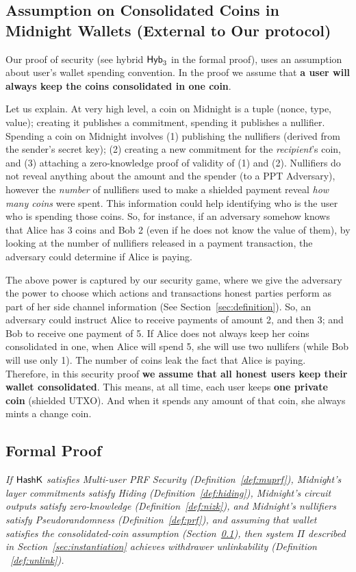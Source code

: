 \subsection{ Assumption on Consolidated Coins in Midnight Wallets (External to Our protocol)}
\label{sub:nofingerprint}
Our proof of security  (see hybrid $\mathsf{Hyb}_3$ in the formal proof), uses an assumption about user's wallet spending convention.
In the proof we assume that  \textbf{a user will always keep the coins consolidated in one coin}.

Let us explain.
At very high level, a coin on Midnight is a tuple (nonce, type, value); creating it publishes a commitment, spending it publishes a nullifier.
Spending a coin on Midnight  involves  (1) publishing the nullifiers (derived from the sender's secret key);  (2) creating a new commitment for the \emph{recipient}'s coin, and  (3) attaching a zero-knowledge proof of validity of (1) and (2).
Nullifiers do not reveal anything about the amount and the spender (to a PPT Adversary), however  the \emph{number} of nullifiers used to make a shielded payment reveal  \emph{how many coins} were spent. This information could help  identifying who is the user who is spending those coins.
So, for instance, if an adversary somehow knows that Alice has 3 coins and Bob 2 (even if he does not know the value of them), by looking at the number of nullifiers released in a  payment transaction, the adversary could determine if Alice is paying.

The above power is captured by our security game, where we give the adversary  the power to choose which actions and  transactions  honest parties perform  as part of her side channel information (See Section~\ref{sec:definition}). So, an adversary could instruct Alice to receive payments of amount 2, and then 3; and Bob to receive one payment of 5.
If Alice does not always keep her coins  consolidated in one, when Alice will spend 5, she will use two nullifers (while Bob will use only 1). The number of coins leak the fact that Alice is paying.
Therefore, in this security proof \textbf{we assume that all honest users keep their wallet consolidated}.
This means, at all time, each user keeps \textbf{one private coin }(shielded UTXO). And when it spends any amount of that coin,  she always mints a change coin.


\subsection{Formal Proof}
\begin{theorem}
\emph{If $\mathsf{HashK}$ satisfies Multi-user PRF Security (Definition~\ref{def:muprf}), Midnight's layer commitments satisfy Hiding (Definition~\ref{def:hiding}), Midnight's circuit outputs satisfy  zero-knowledge (Definition~\ref{def:nizk}), and Midnight's nullifiers satisfy Pseudorandomness (Definition~\ref{def:prf}),  and assuming that wallet satisfies the consolidated-coin assumption (Section~\ref{sub:nofingerprint}),
then system $\Pi$ described in Section~\ref{sec:instantiation}
achieves  withdrawer unlinkability (Definition ~\ref{def:unlink}).}
\end{theorem}


